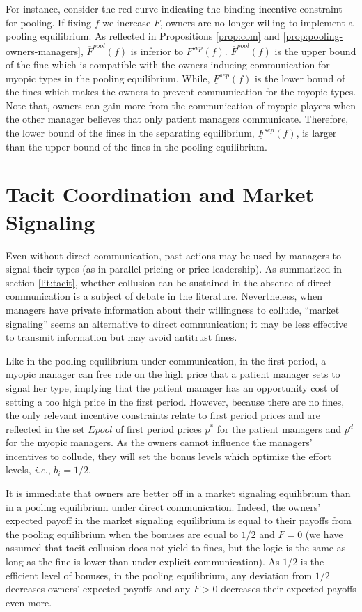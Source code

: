 \documentclass[]{article}
\begin{document}
For instance, consider the red curve indicating the binding incentive constraint for pooling. If fixing $f$ we increase $F$, owners are no longer willing to implement a pooling equilibrium. As reflected in Propositions \ref{prop:com} and \ref{prop:pooling-owners-managers}, $\overline F^{pool}(f)$ is inferior to $\underline{F}^{sep}(f)$. $\overline F^{pool}(f)$ is the upper bound of the fine which is compatible with the owners inducing communication for myopic types in the pooling equilibrium. While, $\underline{F}^{sep}(f)$ is the lower bound of the fines which makes the owners to prevent communication for the myopic types. Note that, owners can gain more from the communication of myopic players when the other manager believes that only patient managers communicate. Therefore, the lower bound of the fines in the separating equilibrium, $\underline{F}^{sep}(f)$, is larger than the upper bound of the fines in the pooling equilibrium.

\section{Tacit Coordination and Market Signaling}\label{sec:MS}
Even without direct communication, past actions may be used by managers to signal their types (as in parallel pricing or price leadership). As summarized in section \ref{lit:tacit}, whether collusion can be sustained in the absence of direct communication is a subject of debate in the literature. Nevertheless, when managers have private information about their willingness to collude, ``market signaling'' seems an alternative to direct communication; it may be less effective to transmit information but may avoid antitrust fines.

Like in the pooling equilibrium under communication, in the first period, a myopic manager can free ride on the high price that a patient manager sets to signal her type, implying that the patient manager has an opportunity cost of setting a too high price in the first period. However, because there are no fines, the only relevant incentive constraints relate to first period prices and are reflected in the set $Epool$ of first period prices $p^*$ for the patient managers and $p^d$ for the myopic managers. As the owners cannot influence the managers' incentives to collude, they will set the bonus levels which optimize the effort levels, \textit{i.e.}, $b_i=1/2$.

It is immediate that owners are better off in a market signaling equilibrium than in a pooling equilibrium under direct communication. Indeed, the owners' expected payoff in the market signaling equilibrium is equal to their payoffs from the pooling equilibrium when the bonuses are equal to $1/2$ and $F=0$ (we have assumed that tacit collusion does not yield to fines, but the logic is the same as long as the fine is lower than under explicit communication). As $1/2$ is the efficient level of bonuses, in the pooling equilibrium, any deviation from $1/2$ decreases owners' expected payoffs and any $F>0$ decreases their expected payoffs even more. 
\end{document}
